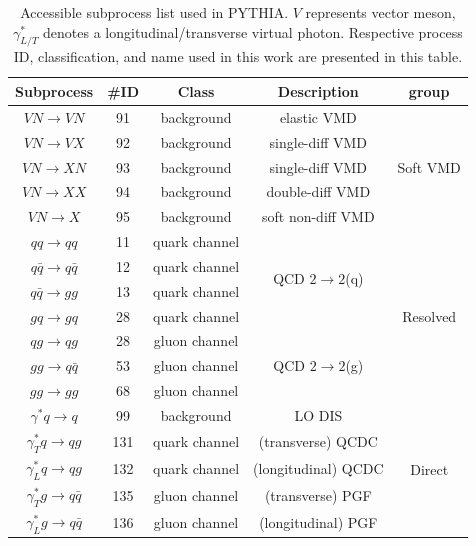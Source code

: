 \begin{table} 
\centering
\begin{tabular} {|c|c|c|c|c|}
\hline
Subprocess			& \#ID&	Class	&	Description		&	group					 \\
\hline
$VN \rightarrow VN$	& 91& background& elastic VMD		& \multirow{5}{*}{Soft VMD}  \\
$VN \rightarrow VX$	& 92& background& single-diff VMD	& 							  \\
$VN \rightarrow XN$	& 93& background& single-diff VMD	&							  \\
$VN \rightarrow	XX$	& 94& background& double-diff VMD	&							  \\
$VN \rightarrow X$	& 95& background& soft non-diff VMD	&							  \\
\hline
$qq \rightarrow qq$	& 11& quark channel& \multirow{4}{*}{QCD $2\rightarrow 2$(q)} & \multirow{7}{*}{Resolved} \\
$q\bar{q} \rightarrow q\bar{q}$	& 12& quark channel&		&	\\
$q\bar{q} \rightarrow gg$	& 13& quark channel&			&	\\
$gq \rightarrow gq$	& 28& quark channel&					&	\\

$qg \rightarrow qg$	& 28& gluon channel	& \multirow{3}{*}{QCD $2\rightarrow 2$(g)} &	\\
$gg \rightarrow q\bar{q}$ & 53& gluon channel&				&	\\
$gg \rightarrow gg$	& 68& gluon channel	&					&	\\
\hline
$\gamma^{*}q \rightarrow q$	& 99& background& LO DIS	&	\multirow{5}{*}{Direct}	\\
$\gamma^{*}_{T}q \rightarrow qg$ & 131& quark channel& (transverse) QCDC	&	\\
$\gamma^{*}_{L}q \rightarrow qg$ & 132& quark channel& (longitudinal) QCDC	&	\\
$\gamma^{*}_{T}g \rightarrow q\bar{q}$ & 135& gluon channel& (transverse) PGF	&	\\
$\gamma^{*}_{L}g \rightarrow q\bar{q}$ & 136& gluon channel& (longitudinal) PGF	&	\\
\hline
\end{tabular}
\caption[Subprocess list implemented in PYTHIA event generator]{Accessible subprocess list used in PYTHIA. $V$ represents vector meson, $\gamma^{*}_{L/T}$ denotes a longitudinal/transverse virtual photon. Respective process ID,  classification, and name used in this work are presented in this table.}\label{tab:processList}
\end{table}


